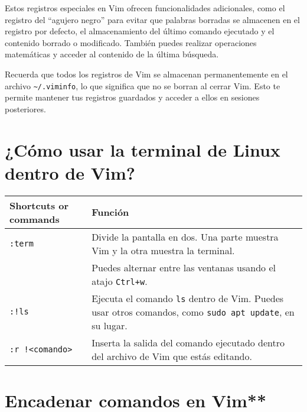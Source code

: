 \documentclass[
  doc,
  floatsintext,
  longtable,
  a4paper,
  nolmodern,
  notxfonts,
  notimes,
  colorlinks=true,linkcolor=blue,citecolor=blue,urlcolor=blue]{apa7}
\begin{document}
Estos registros especiales en Vim ofrecen funcionalidades adicionales,
como el registro del ``agujero negro'' para evitar que palabras borradas
se almacenen en el registro por defecto, el almacenamiento del último
comando ejecutado y el contenido borrado o modificado. También puedes
realizar operaciones matemáticas y acceder al contenido de la última
búsqueda.

Recuerda que todos los registros de Vim se almacenan permanentemente en
el archivo \texttt{\textasciitilde{}/.viminfo}, lo que significa que no
se borran al cerrar Vim. Esto te permite mantener tus registros
guardados y acceder a ellos en sesiones posteriores.

\section{¿Cómo usar la terminal de Linux dentro de
Vim?}\label{cuxf3mo-usar-la-terminal-de-linux-dentro-de-vim}

\begin{longtable}[]{@{}
  >{\raggedright\arraybackslash}p{}
  >{\raggedright\arraybackslash}p{}@{}}
\toprule\noalign{}
\begin{minipage}[b]{\linewidth}\raggedright
Shortcuts or commands
\end{minipage} & \begin{minipage}[b]{\linewidth}\raggedright
Función
\end{minipage} \\
\midrule\noalign{}
\endhead
\bottomrule\noalign{}
\endlastfoot
\texttt{:term} & Divide la pantalla en dos. Una parte muestra Vim y la
otra muestra la terminal. \\
& Puedes alternar entre las ventanas usando el atajo \texttt{Ctrl+w}. \\
\texttt{:!ls} & Ejecuta el comando \texttt{ls} dentro de Vim. Puedes
usar otros comandos, como \texttt{sudo\ apt\ update}, en su lugar. \\
\texttt{:r\ !\textless{}comando\textgreater{}} & Inserta la salida del
comando ejecutado dentro del archivo de Vim que estás editando. \\
\end{longtable}

\section{Encadenar comandos en Vim**}\label{encadenar-comandos-en-vim}
\end{document}
